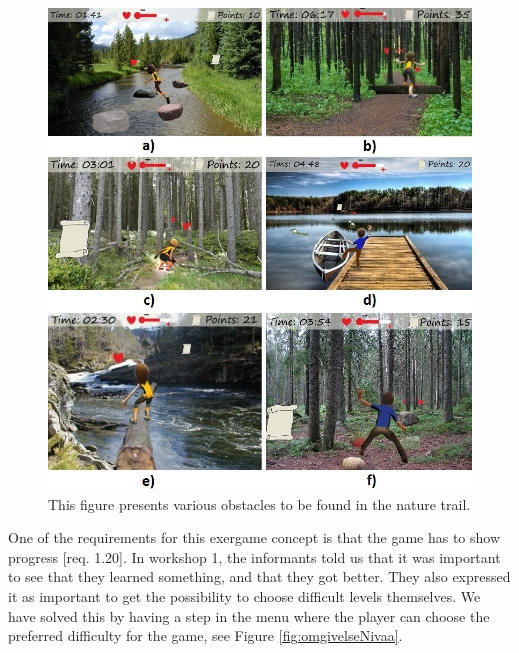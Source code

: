 \begin{figure} [H]
\centering
\includegraphics[scale=0.6]{hindringerEng.jpg}
\caption[Nature trail - obstacles]{This figure presents various obstacles to be found in the nature trail.}
\label{fig:hindring}
\end{figure}

One of the requirements for this exergame concept is that the game has to show progress [req. 1.20]. In workshop 1, the informants told us that it was important to see that they learned something, and that they got better. They also expressed it as important to get the possibility to choose difficult levels themselves. We have solved this by having a step in the menu where the player can choose the preferred difficulty for the game, see Figure \ref{fig:omgivelseNivaa}. 

